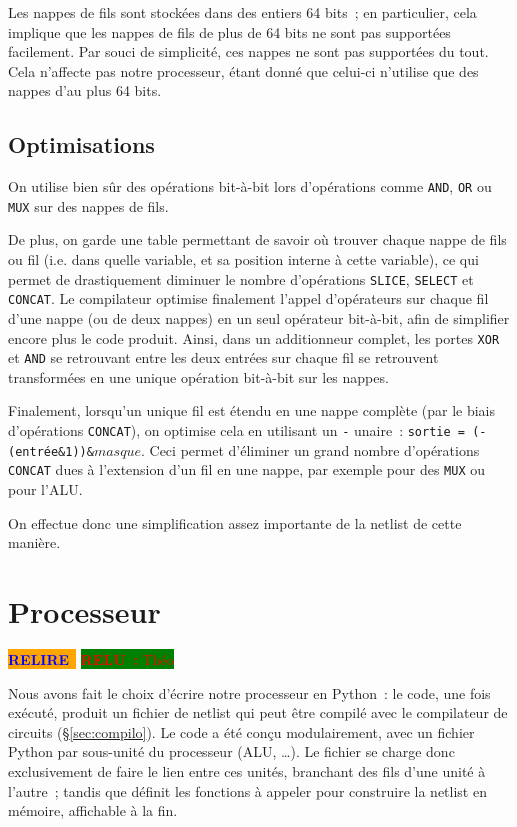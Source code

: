 \documentclass[11pt,a4paper]{article}
\newcommand{\acronym}[1]{\MakeUppercase{#1}}
\newcommand{\relire}{\colorbox{orange}{\textcolor{blue}{\textbf{RELIRE}~}}}
\newcommand{\relu}[1]{\colorbox{green}{\textcolor{red}{\textbf{RELU~:} #1}}}
\begin{document}
Les nappes de fils sont stockées dans des entiers 64 bits~; en
particulier, cela implique que les nappes de fils de plus de 64 bits
ne sont pas supportées facilement. Par souci de simplicité, ces nappes
ne sont pas supportées du tout. Cela n'affecte pas notre processeur,
étant donné que celui-ci n'utilise que des nappes d'au plus 64 bits.

\subsection{Optimisations}

On utilise bien sûr des opérations bit-à-bit lors d'opérations comme
\verb!AND!, \verb!OR! ou \verb!MUX! sur des nappes de fils.

De plus, on garde une table permettant de savoir où trouver chaque
nappe de fils ou fil (i.e. dans quelle variable, et sa position
interne à cette variable), ce qui permet de drastiquement diminuer le
nombre d'opérations \verb!SLICE!, \verb!SELECT! et \verb!CONCAT!. Le
compilateur optimise finalement l'appel d'opérateurs sur chaque fil
d'une nappe (ou de deux nappes) en un seul opérateur bit-à-bit, afin
de simplifier encore plus le code produit. Ainsi, dans un additionneur
complet, les portes \verb!XOR! et \verb!AND! se retrouvant entre les
deux entrées sur chaque fil se retrouvent transformées en une unique
opération bit-à-bit sur les nappes.

Finalement, lorsqu'un unique fil est étendu en une nappe complète (par
le biais d'opérations \verb!CONCAT!), on optimise cela en utilisant un
\verb!-! unaire~: \verb!sortie = (-(entrée&1))&!$masque$. Ceci permet
d'éliminer un grand nombre d'opérations \verb!CONCAT! dues à
l'extension d'un fil en une nappe, par exemple pour des \verb!MUX! ou
pour l'\acronym{alu}.

On effectue donc une simplification assez importante de la netlist de cette manière.


\section{Processeur} \label{sec:proc}

\relire
\relu{Théo}

Nous avons fait le choix d'écrire notre processeur en Python~: le code, une fois exécuté, produit un fichier de netlist qui peut être compilé avec le compilateur de circuits (§\ref{sec:compilo}). Le code a été conçu modulairement, avec un fichier Python par sous-unité du processeur (ALU, \ldots). Le fichier  se charge donc exclusivement de faire le lien entre ces unités, \og branchant \fg{} des fils d'une unité à l'autre~; tandis que  définit les fonctions à appeler pour construire la netlist en mémoire, affichable à la fin.
\end{document}
